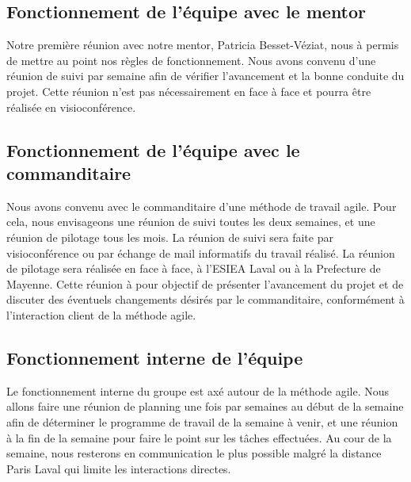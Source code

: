 \subsection {Fonctionnement de l'équipe avec le mentor}
Notre première réunion avec notre mentor, Patricia Besset-Véziat, nous à permis de mettre au point nos règles de fonctionnement.
Nous avons convenu d'une réunion de suivi par semaine afin de vérifier l'avancement et la bonne conduite du projet.
Cette réunion n'est pas nécessairement en face à face et pourra être réalisée en visioconférence.


\subsection {Fonctionnement de l'équipe avec le commanditaire}
Nous avons convenu avec le commanditaire d'une méthode de travail agile.
Pour cela, nous envisageons une réunion de suivi toutes les deux semaines, et une réunion de pilotage tous les mois.
La réunion de suivi sera faite par visioconférence ou par échange de mail informatifs du travail réalisé.
La réunion de pilotage sera réalisée en face à face, à l'ESIEA Laval ou à la Prefecture de Mayenne.
Cette réunion à pour objectif de présenter l'avancement du projet et de discuter des éventuels changements désirés par le commanditaire, conformément à l'interaction client de la méthode agile.


\subsection {Fonctionnement interne de l'équipe}
Le fonctionnement interne du groupe est axé autour de la méthode agile.
Nous allons faire une réunion de planning une fois par semaines au début de la semaine afin de déterminer le programme de travail de la semaine à venir, et une réunion à la fin de la semaine pour faire le point sur les tâches effectuées.
Au cour de la semaine, nous resterons en communication le plus possible malgré la distance Paris Laval qui limite les interactions directes.


